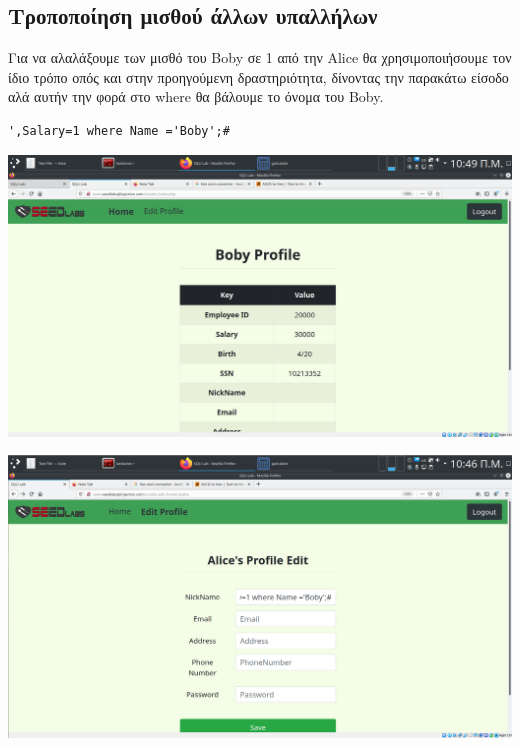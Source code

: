 \subsection{Τροποποίηση μισθού άλλων υπαλλήλων}
\noindent
Για να αλαλάξουμε των μισθό του Boby σε 1 από την Alice θα χρησιμοποιήσουμε
τον ίδιο τρόπο οπός και στην προηγούμενη δραστηριότητα, δίνοντας την παρακάτω είσοδο
αλά αυτήν την φορά στο where θα βάλουμε το όνομα του Boby.

\begin{center}
	\begin{lstlisting}
',Salary=1 where Name ='Boby';#
	\end{lstlisting}	
\end{center}

\begin{center}
			\includegraphics[width=1\textwidth]{image/3.2.0.PNG}		
\end{center}

\begin{center}
			\includegraphics[width=1\textwidth]{image/3.2.1.PNG}		
\end{center}

